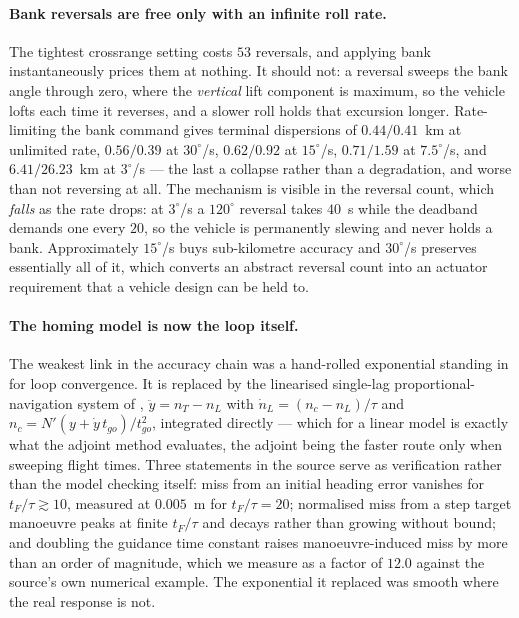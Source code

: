 \documentclass[11pt,a4paper]{article}
\theoremstyle{definition}
\numberwithin{equation}{section}
\begin{document}
\paragraph{Bank reversals are free only with an infinite roll rate.} The tightest crossrange setting costs $53$ reversals, and applying bank instantaneously prices them at nothing. It should not: a reversal sweeps the bank angle through zero, where the \emph{vertical} lift component is maximum, so the vehicle lofts each time it reverses, and a slower roll holds that excursion longer. Rate-limiting the bank command gives terminal dispersions of $0.44/0.41$~km at unlimited rate, $0.56/0.39$ at $30^\circ$/s, $0.62/0.92$ at $15^\circ$/s, $0.71/1.59$ at $7.5^\circ$/s, and $6.41/26.23$~km at $3^\circ$/s --- the last a collapse rather than a degradation, and worse than not reversing at all. The mechanism is visible in the reversal count, which \emph{falls} as the rate drops: at $3^\circ$/s a $120^\circ$ reversal takes $40$~s while the deadband demands one every $20$, so the vehicle is permanently slewing and never holds a bank. Approximately $15^\circ$/s buys sub-kilometre accuracy and $30^\circ$/s preserves essentially all of it, which converts an abstract reversal count into an actuator requirement that a vehicle design can be held to.

\paragraph{The homing model is now the loop itself.} The weakest link in the accuracy chain was a hand-rolled exponential standing in for loop convergence. It is replaced by the linearised single-lag proportional-navigation system of \cite{zarchan2012}, $\ddot y = n_T - n_L$ with $\dot n_L = (n_c - n_L)/\tau$ and $n_c = N'(y + \dot y\, t_{go})/t_{go}^2$, integrated directly --- which for a linear model is exactly what the adjoint method evaluates, the adjoint being the faster route only when sweeping flight times. Three statements in the source serve as verification rather than the model checking itself: miss from an initial heading error vanishes for $t_F/\tau \gtrsim 10$, measured at $0.005$~m for $t_F/\tau = 20$; normalised miss from a step target manoeuvre peaks at finite $t_F/\tau$ and decays rather than growing without bound; and doubling the guidance time constant raises manoeuvre-induced miss by more than an order of magnitude, which we measure as a factor of $12.0$ against the source's own numerical example. The exponential it replaced was smooth where the real response is not.
\end{document}

